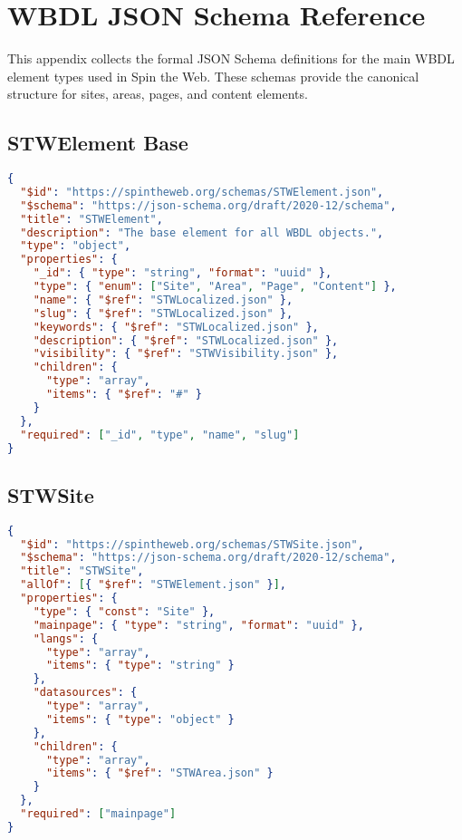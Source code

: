 
\chapter{WBDL JSON Schema Reference}
\label{app:wbdl-json-schema}

This appendix collects the formal JSON Schema definitions for the main WBDL element types used in Spin the Web. These schemas provide the canonical structure for sites, areas, pages, and content elements.

\section{STWElement Base}
\begin{lstlisting}[language=JSON,caption={STWElement Base Schema Definition}]
{
  "$id": "https://spintheweb.org/schemas/STWElement.json",
  "$schema": "https://json-schema.org/draft/2020-12/schema",
  "title": "STWElement",
  "description": "The base element for all WBDL objects.",
  "type": "object",
  "properties": {
    "_id": { "type": "string", "format": "uuid" },
    "type": { "enum": ["Site", "Area", "Page", "Content"] },
    "name": { "$ref": "STWLocalized.json" },
    "slug": { "$ref": "STWLocalized.json" },
    "keywords": { "$ref": "STWLocalized.json" },
    "description": { "$ref": "STWLocalized.json" },
    "visibility": { "$ref": "STWVisibility.json" },
    "children": {
      "type": "array",
      "items": { "$ref": "#" }
    }
  },
  "required": ["_id", "type", "name", "slug"]
}
\end{lstlisting}

\section{STWSite}
\begin{lstlisting}[language=JSON,caption={STWSite Schema Definition}]
{
  "$id": "https://spintheweb.org/schemas/STWSite.json",
  "$schema": "https://json-schema.org/draft/2020-12/schema",
  "title": "STWSite",
  "allOf": [{ "$ref": "STWElement.json" }],
  "properties": {
    "type": { "const": "Site" },
    "mainpage": { "type": "string", "format": "uuid" },
    "langs": {
      "type": "array",
      "items": { "type": "string" }
    },
    "datasources": {
      "type": "array",
      "items": { "type": "object" }
    },
    "children": {
      "type": "array",
      "items": { "$ref": "STWArea.json" }
    }
  },
  "required": ["mainpage"]
}
\end{lstlisting}

